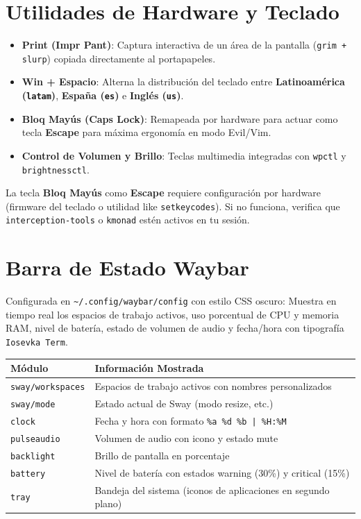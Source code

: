 \documentclass[11pt,article,spanish]{apuntes-scr}
\begin{document}
\section{Utilidades de Hardware y Teclado}
\begin{itemize}[leftmargin=*]
    \item \textbf{Print (Impr Pant)}: Captura interactiva de un área de la pantalla (\texttt{grim + slurp}) copiada directamente al portapapeles.
    \item \textbf{Win + Espacio}: Alterna la distribución del teclado entre \textbf{Latinoamérica (\texttt{latam})}, \textbf{España (\texttt{es})} e \textbf{Inglés (\texttt{us})}.
    \item \textbf{Bloq Mayús (Caps Lock)}: Remapeada por hardware para actuar como tecla \textbf{Escape} para máxima ergonomía en modo Evil/Vim.
    \item \textbf{Control de Volumen y Brillo}: Teclas multimedia integradas con \texttt{wpctl} y \texttt{brightnessctl}.
\end{itemize}

\begin{warningbox}
  La tecla \textbf{Bloq Mayús} como \textbf{Escape} requiere configuración por hardware (firmware del teclado o utilidad like \texttt{setkeycodes}). Si no funciona, verifica que \texttt{interception-tools} o \texttt{kmonad} estén activos en tu sesión.
\end{warningbox}

\section{Barra de Estado Waybar}
Configurada en \texttt{\textasciitilde/.config/waybar/config} con estilo CSS oscuro:
Muestra en tiempo real los espacios de trabajo activos, uso porcentual de CPU y memoria RAM, nivel de batería, estado de volumen de audio y fecha/hora con tipografía \texttt{Iosevka Term}.

\begin{center}
\small
\begin{tabularx}{\linewidth}{l X}
\toprule
\textbf{Módulo} & \textbf{Información Mostrada} \\
\midrule
\texttt{sway/workspaces} & Espacios de trabajo activos con nombres personalizados \\
\texttt{sway/mode} & Estado actual de Sway (modo resize, etc.) \\
\texttt{clock} & Fecha y hora con formato \texttt{\%a \%d \%b | \%H:\%M} \\
\texttt{pulseaudio} & Volumen de audio con icono y estado mute \\
\texttt{backlight} & Brillo de pantalla en porcentaje \\
\texttt{battery} & Nivel de batería con estados warning (30\%) y critical (15\%) \\
\texttt{tray} & Bandeja del sistema (iconos de aplicaciones en segundo plano) \\
\bottomrule
\end{tabularx}
\end{center}

\backmatter
\end{document}
